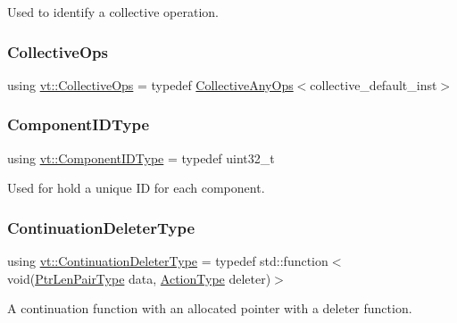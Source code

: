 Used to identify a collective operation. 

\mbox{\label{namespacevt_a776b30f114cff62549e798fedeb6222b}} 
\subsubsection{\texorpdfstring{Collective\+Ops}{CollectiveOps}}
{\footnotesize\ttfamily using \hyperlink{namespacevt_a776b30f114cff62549e798fedeb6222b}{vt\+::\+Collective\+Ops} = typedef \hyperlink{structvt_1_1_collective_any_ops}{Collective\+Any\+Ops}$<$collective\+\_\+default\+\_\+inst$>$}

\mbox{\label{namespacevt_ab6ac935c168b809c422d5121da4f2700}} 
\subsubsection{\texorpdfstring{Component\+I\+D\+Type}{ComponentIDType}}
{\footnotesize\ttfamily using \hyperlink{namespacevt_ab6ac935c168b809c422d5121da4f2700}{vt\+::\+Component\+I\+D\+Type} = typedef uint32\+\_\+t}



Used for hold a unique ID for each component. 

\mbox{\label{namespacevt_a6de3bd201e2a040be9362d9d24d1e446}} 
\subsubsection{\texorpdfstring{Continuation\+Deleter\+Type}{ContinuationDeleterType}}
{\footnotesize\ttfamily using \hyperlink{namespacevt_a6de3bd201e2a040be9362d9d24d1e446}{vt\+::\+Continuation\+Deleter\+Type} = typedef std\+::function$<$void(\hyperlink{namespacevt_a97f320a1d3b9b4035e591671cd7d10f0}{Ptr\+Len\+Pair\+Type} data, \hyperlink{namespacevt_ae0a5a7b18cc99d7b732cb4d44f46b0f3}{Action\+Type} deleter)$>$}



A continuation function with an allocated pointer with a deleter function. 

